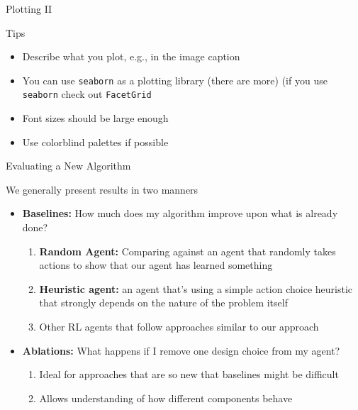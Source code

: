 \documentclass[aspectratio=169]{../latex_main/tntbeamer}  %
\begin{document}

\begin{frame}[c]{Plotting II}

    Tips
    \begin{itemize}
        \item Describe what you plot, e.g., in the image caption
        \item You can use \texttt{seaborn} as a plotting library (there are more) (if you use \texttt{seaborn} check out \texttt{FacetGrid} 
        \item Font sizes should be large enough
        \item Use colorblind palettes if possible
    \end{itemize}

    
\end{frame}


\begin{frame}[c]{Evaluating a New Algorithm}

    We generally present results in two manners 
    \vfill
    \begin{itemize}
        \item  \textbf{Baselines:} How much does my algorithm improve upon what is already done?
            \begin{enumerate}
                \item \textbf{Random Agent:} Comparing against an agent that randomly takes actions to show that our agent has learned something 
                \item \textbf{Heuristic agent:} an agent that’s using a simple action choice heuristic that strongly depends on the nature of the problem itself
                \item Other RL agents that follow approaches similar to our approach
            \end{enumerate}
        \vfill
        \item  \textbf{Ablations:} What happens if I remove one design choice from my agent?
            \begin{enumerate}
                \item Ideal for approaches that are so new that baselines might be difficult 
                \item Allows understanding of how different components behave
            \end{enumerate}
        
    \end{itemize}

\end{frame}
\end{document}
